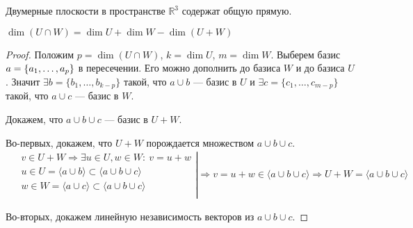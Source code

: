 \begin{Examples}
Двумерные плоскости в пространстве $\mathbb{R}^3$ содержат общую прямую.
\end{Examples}

\begin{Theorem}
$\dim \left(U \cap W\right) = \dim U + \dim W - \dim \left(U+W\right)$
\end{Theorem}

\begin{proof}
Положим $p = \dim \left(U \cap W\right)$, $k = \dim U$, $m = \dim W$. Выберем базис $a \hm{=} \{ a_1, \ldots, a_p\}$ в пересечении. Его можно дополнить до базиса $W$ и до базиса $U$. Значит $\exists b = \{ b_1, \ldots, b_{k-p}\}$ такой, что $a\cup b$ --- базис в $U$ и $\exists c = \{ c_1, \ldots, c_{m-p}\}$ такой, что $a \cup c$ --- базис в $W$.

Докажем, что $a \cup b \cup c$ --- базис в $U+W$.

Во-первых, докажем, что $U+W$ порождается множеством $a \cup b \cup c$.
\begin{gather*}
\left.
\begin{aligned}
    &v \in U+W \Rightarrow \exists u \in U, w \in W\colon \ v = u+w\\
    &u \in U=\langle a \cup b\rangle \subset \langle a \cup b \cup c\rangle\\
    &w \in W=\langle a \cup c\rangle \subset \langle a \cup b \cup c\rangle\\
\end{aligned}
\right|
    \Rightarrow v = u + w \in \langle a \cup b \cup c\rangle 
    \Rightarrow U + W = \langle a \cup b \cup c\rangle
\end{gather*}

Во-вторых, докажем линейную независимость векторов из $a \cup b \cup c$.


\end{proof}
